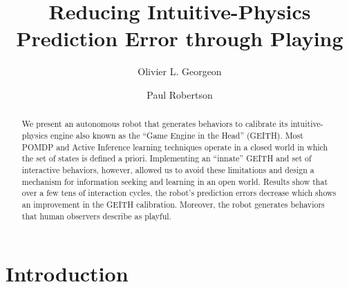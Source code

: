 \documentclass[runningheads]{llncs}
\begin{document}
%
\title{Reducing Intuitive-Physics Prediction Error through Playing}
%
%
\author{Olivier L. Georgeon \and
Paul Robertson }
%
%
%
\maketitle              %
%
\begin{abstract}
We present an autonomous robot that generates behaviors to calibrate its intuitive-physics engine also known as the ``Game Engine in the Head'' (GEITH).
Most POMDP and Active Inference learning techniques operate in a closed world in which the set of states is defined a priori. 
Implementing an ``innate'' GEITH and set of interactive behaviors, however, allowed us to avoid these limitations and design a mechanism for information seeking and learning in an open world. 
Results show that over a few tens of interaction cycles, the robot's prediction errors decrease which shows an improvement in the GEITH calibration. 
Moreover, the robot generates behaviors that human observers describe as playful.

\end{abstract}
%
%
%
\section{Introduction}
\label{sec:intro}
\end{document}
